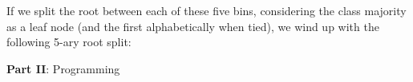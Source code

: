 \documentclass{article}
\begin{document}
\begin{enumerate}[leftmargin=\labelsep]
If we split the root between each of these five bins, 
considering the class majority as a leaf node
(and the first alphabetically when tied), 
we wind up with the following 5-ary root split:

\vfill

\fbox{
\centering
\begin{minipage}{\textwidth}
  \centering
  \textbf{Solution} \\
  \begin{table}[H]
    \centering
    \begin{tabular}{ccccc}
      $[0; 0.20[$ & $[0.20; 0.40[$ & $[0.40; 0.60[$ & $[0.60; 0.80[$ & $[0.80; 1]$ \\ \midrule
      C & B & C & A & A 
    \end{tabular}
  \end{table}
\end{minipage}
}
\end{enumerate}

\vfill

\newpage

\large{\textbf{Part II}: Programming}\normalsize
\end{document}
